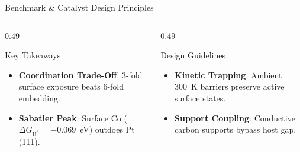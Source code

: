 \documentclass[aspectratio=169]{beamer}
\begin{document}
\begin{frame}{Benchmark \& Catalyst Design Principles}
\begin{columns}[T]
\begin{column}{0.49\textwidth}
      \begin{block}{\scriptsize Key Takeaways}
        \scriptsize
      \begin{itemize}\setlength{\itemsep}{0.5pt}
          \item \textbf{Coordination Trade-Off}: 3-fold surface exposure beats 6-fold embedding.
          \item \textbf{Sabatier Peak}: Surface Co ($\Delta G_{\text{H}^*} = -0.069$~eV) outdoes Pt (111).
        \end{itemize}
      \end{block}
    \end{column}
    \begin{column}{0.49\textwidth}
      \begin{exampleblock}{\scriptsize Design Guidelines}
        \scriptsize
      \begin{itemize}\setlength{\itemsep}{0.5pt}
          \item \textbf{Kinetic Trapping}: Ambient 300~K barriers preserve active surface states.
          \item \textbf{Support Coupling}: Conductive carbon supports bypass host gap.
        \end{itemize}
      \end{exampleblock}
    \end{column}
  \end{columns}
\end{frame}
\end{document}
